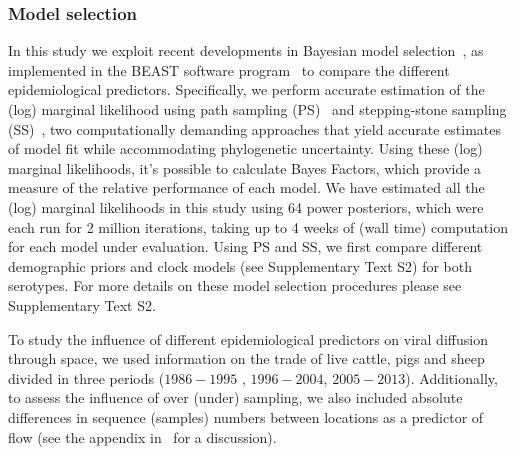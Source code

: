 \documentclass[10pt]{article}
\begin{document}
\subsubsection*{Model selection}

In this study we exploit recent developments in Bayesian model selection~\citep{Baele2012, Baele2013a, Baele2013b, Baele2013c}, as implemented in the BEAST software program~\citep{Drummond2012} to compare the different epidemiological predictors.
Specifically, we perform accurate estimation of the (log) marginal likelihood using path sampling (PS)~\citep{Lartillot2006} and stepping-stone sampling (SS)~\citep{Xie2011}, two computationally demanding approaches that yield accurate estimates of model fit while accommodating phylogenetic uncertainty.
Using these (log) marginal likelihoods, it's possible to calculate Bayes Factors, which provide a measure of the relative performance of each model. 
We have estimated all the (log) marginal likelihoods in this study using 64 power posteriors, which were each run for 2 million iterations, taking up to 4 weeks of (wall time) computation for each model under evaluation. 
Using PS and SS, we first compare different demographic priors and clock models (see Supplementary Text S2) for both serotypes. 
For more details on these model selection procedures please see Supplementary Text S2.

To study the influence of different epidemiological predictors on viral diffusion through space, we used information on the trade of live cattle, pigs and sheep divided in three periods ($1986-1995$ , $1996-2004$, $2005-2013$).
Additionally, to assess the influence of over (under) sampling, we also included absolute differences in sequence (samples) numbers between locations as a predictor of flow (see the appendix in~\cite{Lemey2014} for a discussion).
\end{document}
